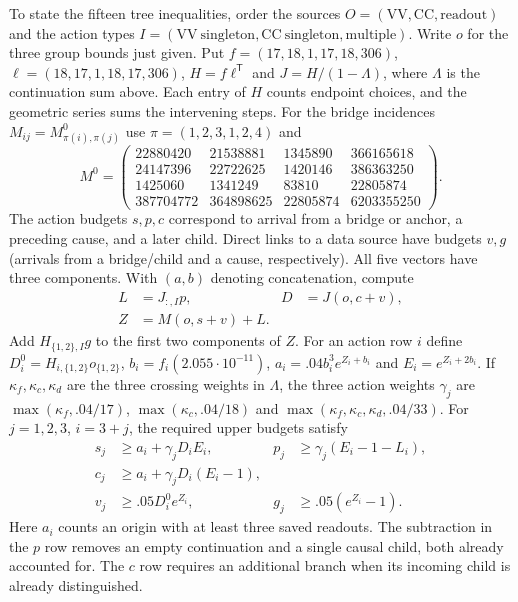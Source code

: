 \documentclass[10pt,twocolumn]{article}
\theoremstyle{definition}
\begin{document}
To state the fifteen tree inequalities, order the sources
$O=(\mathrm{VV},\mathrm{CC},\mathrm{readout})$ and the action types
$I=(\mathrm{VV\ singleton},\mathrm{CC\ singleton},\mathrm{multiple})$.
Write $o$ for the three group bounds just given. Put
$f=(17,18,1,17,18,306)$, $\ell=(18,17,1,18,17,306)$,
$H=f\ell^{\mathsf T}$ and $J=H/(1-\Lambda)$, where $\Lambda$ is the
continuation sum above. Each entry of $H$ counts endpoint choices,
and the geometric series sums the intervening steps. For the bridge
incidences $M_{ij}=M^0_{\pi(i),\pi(j)}$ use
$\pi=(1,2,3,1,2,4)$ and
\begingroup\small\setlength{\arraycolsep}{2pt}
\[
M^0=\begin{pmatrix}
22880420&21538881&1345890&366165618\\
24147396&22722625&1420146&386363250\\
1425060&1341249&83810&22805874\\
387704772&364898625&22805874&6203355250
\end{pmatrix}.
\]
\endgroup
The action budgets $s,p,c$ correspond to arrival from a bridge or
anchor, a preceding cause, and a later child. Direct links to a
data source have budgets $v,g$ (arrivals from a bridge/child
and a cause, respectively). All five vectors have three components.
With $(a,b)$ denoting concatenation, compute
\[
\begin{aligned}
 L &= J_{:,I}p,& D &= J(o,c+v),\\
 Z &= M(o,s+v)+L .
\end{aligned}
\]
Add $H_{\{1,2\},I}g$ to the first two components of $Z$.
For an action row $i$ define $D_i^0=H_{i,\{1,2\}}o_{\{1,2\}}$,
$b_i=f_i(2.055\cdot10^{-11})$,
$a_i=.04b_i^3e^{Z_i+b_i}$ and $E_i=e^{Z_i+2b_i}$.
If $\kappa_f,\kappa_c,\kappa_d$ are the three crossing weights in
$\Lambda$, the three action weights $\gamma_j$ are
$\max(\kappa_f,.04/17)$, $\max(\kappa_c,.04/18)$ and
$\max(\kappa_f,\kappa_c,\kappa_d,.04/33)$. For $j=1,2,3$,
$i=3+j$, the required upper budgets satisfy
\[
\begin{aligned}
 s_j&\ge a_i+\gamma_jD_iE_i, &
 p_j&\ge\gamma_j(E_i-1-L_i),\\
 c_j&\ge a_i+\gamma_jD_i(E_i-1),\\
 v_j&\ge .05D_i^0e^{Z_i}, &
 g_j&\ge .05(e^{Z_i}-1).
\end{aligned}
\]
Here $a_i$ counts an origin with at least three saved readouts.
The subtraction in the $p$ row removes an empty continuation and a
single causal child, both already accounted for. The $c$ row requires
an additional branch when its incoming child is already distinguished.
\end{document}
